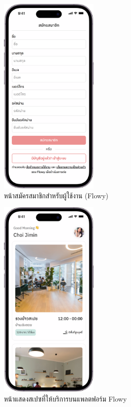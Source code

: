 \begin{figure}[ht]
    \begin{center}
    \includegraphics[width=1.9in]{./image/Flowy_register.png}
    \end{center}
    \caption[Flowy register]{หน้าสมัครสมาชิกสำหรับผู้ใช้งาน (Flowy)}
    \label{fig:Flowy_register}
\end{figure}
\begin{figure}[ht]
    \begin{center}
    \includegraphics[width=1.9in]{./image/Flowy_explore.png}
    \end{center}
    \caption[Flowy explore]{หน้าแสดงสเปซที่ให้บริการบนแพลตฟอร์ม Flowy}
    \label{fig:Flowy_explore}
\end{figure}
